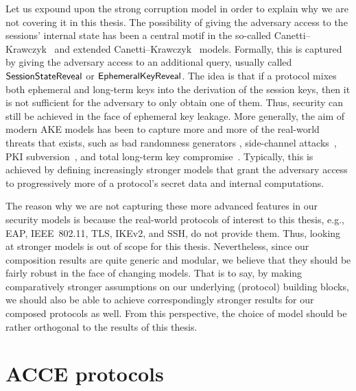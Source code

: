 Let us expound upon the strong corruption model in order to explain why we are not covering it in this thesis. 
The possibility of giving the adversary access to the sessions' internal state has been a central motif in the so-called Canetti--Krawczyk~\cite{EC:CanKra01} and extended Canetti--Krawczyk~\cite{PROVSEC:LaMLauMit07} models.
Formally,
this is captured by giving the adversary access to an additional query,
usually called $\mathsf{SessionStateReveal}$ or $\mathsf{EphemeralKeyReveal}$.
The idea is that if a protocol mixes both ephemeral and long-term keys into the derivation of the session keys,
then it is not sufficient for the adversary to only obtain one of them.
Thus, security can still be achieved in the face of ephemeral key leakage.
More generally,
the aim of modern AKE models has been to capture more and more of the real-world threats that exists,
such as bad randomness generators \cite{EPRINT:FelCre14},
side-channel attacks~\cite{C:AlwDodWic09,ASIACCS:MorOka11,ASIACCS:AlaSteBoy14,IMA:AlaSteBoy15},
PKI subversion~\cite{ESORICS:BCFPPS13},
and total long-term key compromise~\cite{Cohn-GordonCG:2016:post-compromise}.
Typically,
this is achieved by defining increasingly stronger models that grant the adversary access to progressively more of a protocol's secret data and internal computations.

The reason why we are not capturing these more advanced features in our security models is because  the real-world protocols  of interest to this thesis,
e.g.,
EAP, IEEE~802.11, TLS, IKEv2, and SSH, 
do not provide them.
Thus,
looking at stronger models is out of scope for this thesis.
Nevertheless,
since our composition results are quite generic and modular,
we believe that they should be fairly robust in the face of changing models.
That is to say,
by making comparatively stronger assumptions on our underlying (protocol) building blocks,
we should also be able to achieve correspondingly stronger results for our composed protocols as well.
From this perspective,
the choice of model should be rather orthogonal to the results of this thesis. 





 
\section{ACCE protocols}\label{sec:definitions:ACCE}

